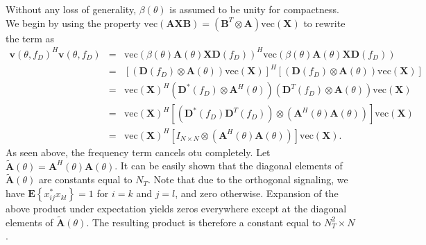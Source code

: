 \documentclass[journal,draftcls,onecolumn,twoside]{IEEEtran}
\begin{document}
Without any loss of generality, $\beta(\theta)$ is assumed to be unity for compactness. We begin by using the property $\mathrm{vec}(\mathbf{A}\mathbf{X}\mathbf{B}) = (\mathbf{B}^{T} \otimes \mathbf{A})\mathrm{vec}(\mathbf{X})$ to rewrite the term as
\begin{eqnarray}
\mathbf{v}(\theta,f_{D})^{H}\mathbf{v}(\theta,f_{D}) & = & \mathrm{vec}(\beta(\theta)\mathbf{A}(\theta)\mathbf{X}\mathbf{D}(f_{D}))^{H}\mathrm{vec}(\beta(\theta)\mathbf{A}(\theta)\mathbf{X}\mathbf{D}(f_{D})) \\
& = & \left[(\mathbf{D}(f_{D}) \otimes \mathbf{A}(\theta))\mathrm{vec}(\mathbf{X})\right]^{H}\left[(\mathbf{D}(f_{D}) \otimes \mathbf{A}(\theta))\mathrm{vec}(\mathbf{X})\right] \\
& = & \mathrm{vec}(\mathbf{X})^{H}(\mathbf{D}^{*}(f_{D}) \otimes \mathbf{A}^{H}(\theta))(\mathbf{D}^{T}(f_{D}) \otimes \mathbf{A}(\theta))\mathrm{vec}(\mathbf{X}) \\
& = & \mathrm{vec}(\mathbf{X})^{H}\left[(\mathbf{D}^{*}(f_{D}) \mathbf{D}^{T}(f_{D})) \otimes (\mathbf{A}^{H}(\theta) \mathbf{A}(\theta))\right]\mathrm{vec}(\mathbf{X}) \\
& = & \mathrm{vec}(\mathbf{X})^{H}\left[I_{N \times N} \otimes (\mathbf{A}^{H}(\theta) \mathbf{A}(\theta))\right]\mathrm{vec}(\mathbf{X}).
\end{eqnarray}
As seen above, the frequency term cancels otu completely. Let $\tilde{\mathbf{A}}(\theta) = \mathbf{A}^{H}(\theta)\mathbf{A}(\theta)$. It can be easily shown that the diagonal elements of $\tilde{\mathbf{A}}(\theta)$ are constants equal to $N_{T}$. Note that due to the orthogonal signaling, we have $\mathbf{E}\left\lbrace x_{ij}^{*}x_{kl}\right\rbrace = 1$ for $i = k$ and $j = l$, and zero otherwise. Expansion of the above product under expectation yields zeros everywhere except at the diagonal elements of $\tilde{\mathbf{A}}(\theta)$. The resulting product is therefore a constant equal to $N_{T}^{2} \times N$.

%

%
%

\ifCLASSOPTIONcaptionsoff
  \newpage
\fi
\end{document}
